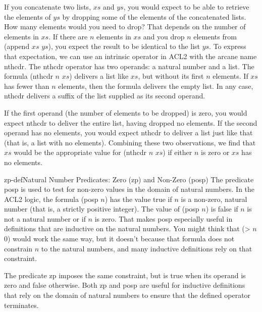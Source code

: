 If you concatenate two lists, $xs$ and $ys$,
you would expect to be able to retrieve the elements
of $ys$ by dropping some of the elements of the concatenated lists.
How many elements would you need to drop?
That depends on the number of elements in $xs$.
If there are $n$ elements in $xs$ and you drop $n$ elements
from \textsf{(append $xs$ $ys$)}, you expect the result to be identical
to the list $ys$. To express that expectation, we can use
an intrinsic operator in ACL2 with the arcane name \textsf{nthcdr}.
The \textsf{nthcdr} operator has two operands: a natural number and a list.
The formula \textsf{(nthcdr $n$ $xs$)} delivers a list like $xs$,
but without its first $n$ elements.
If $xs$ has fewer than $n$ elements,
then the formula delivers the empty list.
In any case, \textsf{nthcdr} delivers a suffix of the list
supplied as its second operand.

If the first operand (the number of elements to be dropped) is zero,
you would expect
\textsf{nthcdr} to deliver the entire list, having dropped no elements.
If the second operand has no elements,
you would expect
\textsf{nthcdr} to deliver a list just like that
(that is, a list with no elements).
Combining these two observations, we find that
$xs$ would be the appropriate value for \textsf{(nthcdr $n$ $xs$)}
if either $n$ is zero or $xs$ has no elements.

\begin{aside}{zp-def}{Natural Number Predicates: Zero (\textsf{zp}) and Non-Zero (\textsf{posp})}
The predicate \textsf{posp} is used to test for non-zero values
in the domain of natural numbers.
In the ACL2 logic, the formula \textsf{(posp $n$)} has the value true if $n$ is
a non-zero, natural number (that is, a strictly positive integer).
The value of \textsf{(posp $n$)} is false if $n$ is not a natural number
or if $n$ is zero.
That makes \textsf{posp} especially useful
in definitions that are inductive on the natural numbers.
You might think that \textsf{(> $n$ 0)} would
work the same way, but it doesn't because that formula %
does not constrain $n$ to the natural numbers,
and many inductive definitions rely on that constraint.

The predicate \textsf{zp} imposes the same constraint,
but is true when its operand is zero and false otherwise.
Both \textsf{zp} and \textsf{posp} are useful for inductive definitions that
rely on the domain of natural numbers to ensure that the defined operator
terminates.
\end{aside}

